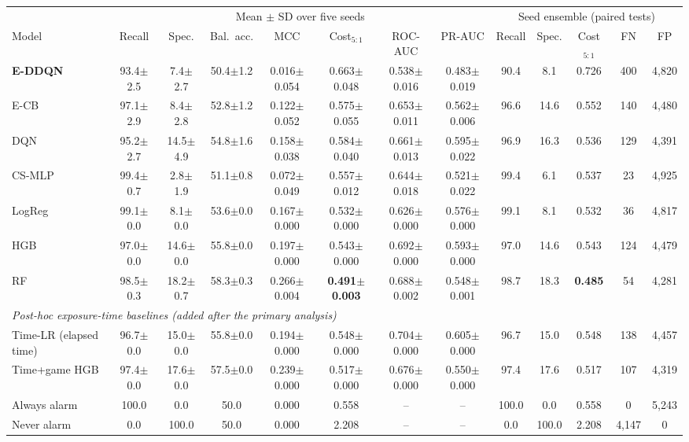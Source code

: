 \begin{tabular}{lccccccc|ccccc}
\toprule
 & \multicolumn{7}{c|}{Mean $\pm$ SD over five seeds} & \multicolumn{5}{c}{Seed ensemble (paired tests)} \\
Model & Recall & Spec. & Bal.\ acc. & MCC & Cost$_{5:1}$ & ROC-AUC & PR-AUC & Recall & Spec. & Cost$_{5:1}$ & FN & FP \\
\midrule
\textbf{E-DDQN} & 93.4$\pm$2.5 & 7.4$\pm$2.7 & 50.4$\pm$1.2 & 0.016$\pm$0.054 & 0.663$\pm$0.048 & 0.538$\pm$0.016 & 0.483$\pm$0.019 & 90.4 & 8.1 & 0.726 & 400 & 4,820 \\
E-CB & 97.1$\pm$2.9 & 8.4$\pm$2.8 & 52.8$\pm$1.2 & 0.122$\pm$0.052 & 0.575$\pm$0.055 & 0.653$\pm$0.011 & 0.562$\pm$0.006 & 96.6 & 14.6 & 0.552 & 140 & 4,480 \\
DQN & 95.2$\pm$2.7 & 14.5$\pm$4.9 & 54.8$\pm$1.6 & 0.158$\pm$0.038 & 0.584$\pm$0.040 & 0.661$\pm$0.013 & 0.595$\pm$0.022 & 96.9 & 16.3 & 0.536 & 129 & 4,391 \\
CS-MLP & 99.4$\pm$0.7 & 2.8$\pm$1.9 & 51.1$\pm$0.8 & 0.072$\pm$0.049 & 0.557$\pm$0.012 & 0.644$\pm$0.018 & 0.521$\pm$0.022 & 99.4 & 6.1 & 0.537 & 23 & 4,925 \\
LogReg & 99.1$\pm$0.0 & 8.1$\pm$0.0 & 53.6$\pm$0.0 & 0.167$\pm$0.000 & 0.532$\pm$0.000 & 0.626$\pm$0.000 & 0.576$\pm$0.000 & 99.1 & 8.1 & 0.532 & 36 & 4,817 \\
HGB & 97.0$\pm$0.0 & 14.6$\pm$0.0 & 55.8$\pm$0.0 & 0.197$\pm$0.000 & 0.543$\pm$0.000 & 0.692$\pm$0.000 & 0.593$\pm$0.000 & 97.0 & 14.6 & 0.543 & 124 & 4,479 \\
RF & 98.5$\pm$0.3 & 18.2$\pm$0.7 & 58.3$\pm$0.3 & 0.266$\pm$0.004 & \textbf{0.491$\pm$0.003} & 0.688$\pm$0.002 & 0.548$\pm$0.001 & 98.7 & 18.3 & \textbf{0.485} & 54 & 4,281 \\
\midrule
\multicolumn{13}{l}{\emph{Post-hoc exposure-time baselines (added after the primary analysis)}} \\
Time-LR (elapsed time) & 96.7$\pm$0.0 & 15.0$\pm$0.0 & 55.8$\pm$0.0 & 0.194$\pm$0.000 & 0.548$\pm$0.000 & 0.704$\pm$0.000 & 0.605$\pm$0.000 & 96.7 & 15.0 & 0.548 & 138 & 4,457 \\
Time+game HGB & 97.4$\pm$0.0 & 17.6$\pm$0.0 & 57.5$\pm$0.0 & 0.239$\pm$0.000 & 0.517$\pm$0.000 & 0.676$\pm$0.000 & 0.550$\pm$0.000 & 97.4 & 17.6 & 0.517 & 107 & 4,319 \\
\midrule
Always alarm & 100.0 & 0.0 & 50.0 & 0.000 & 0.558 & -- & -- & 100.0 & 0.0 & 0.558 & 0 & 5,243 \\
Never alarm & 0.0 & 100.0 & 50.0 & 0.000 & 2.208 & -- & -- & 0.0 & 100.0 & 2.208 & 4,147 & 0 \\
\bottomrule
\end{tabular}
